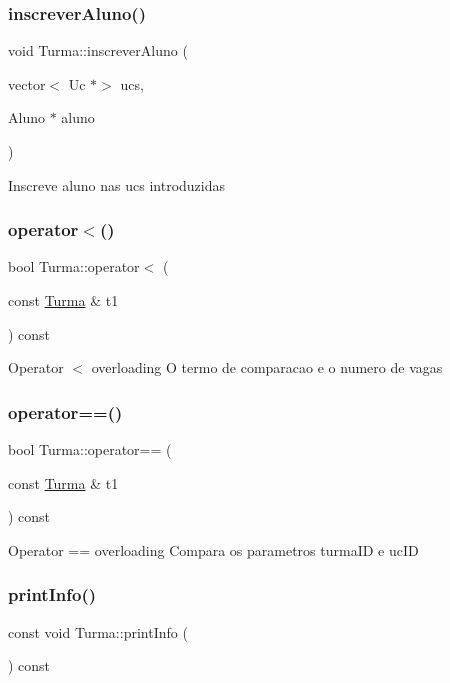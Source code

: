 \subsubsection{\texorpdfstring{inscrever\+Aluno()}{inscreverAluno()}}
{\footnotesize\ttfamily void Turma\+::inscrever\+Aluno (\begin{DoxyParamCaption}\item[{vector$<$ Uc $\ast$$>$}]{ucs,  }\item[{Aluno $\ast$}]{aluno }\end{DoxyParamCaption})}

Inscreve aluno nas ucs introduzidas \hypertarget{class_turma_a4d80e915fa31fbe3ad70de1919641e5e}{}\label{class_turma_a4d80e915fa31fbe3ad70de1919641e5e} 
\subsubsection{\texorpdfstring{operator$<$()}{operator<()}}
{\footnotesize\ttfamily bool Turma\+::operator$<$ (\begin{DoxyParamCaption}\item[{const \hyperlink{class_turma}{Turma} \&}]{t1 }\end{DoxyParamCaption}) const}

Operator $<$ overloading O termo de comparacao e\textquotesingle{} o numero de vagas \hypertarget{class_turma_aa501aa0b3e7aa254a670d1bf35e4ee81}{}\label{class_turma_aa501aa0b3e7aa254a670d1bf35e4ee81} 
\subsubsection{\texorpdfstring{operator==()}{operator==()}}
{\footnotesize\ttfamily bool Turma\+::operator== (\begin{DoxyParamCaption}\item[{const \hyperlink{class_turma}{Turma} \&}]{t1 }\end{DoxyParamCaption}) const}

Operator == overloading Compara os parametros turma\+ID e uc\+ID \hypertarget{class_turma_ad295f90f4a29569b2a01de0acdb16d94}{}\label{class_turma_ad295f90f4a29569b2a01de0acdb16d94} 
\subsubsection{\texorpdfstring{print\+Info()}{printInfo()}}
{\footnotesize\ttfamily const void Turma\+::print\+Info (\begin{DoxyParamCaption}{ }\end{DoxyParamCaption}) const}


